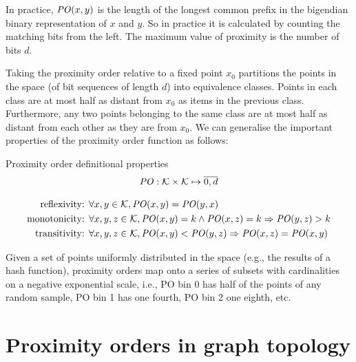 In practice, $\mathit{PO}(x,y)$ is the length of the longest common prefix in the bigendian binary representation of $x$ and $y$. So in practice it is calculated by counting the matching bits from the left. The maximum value of proximity is the number of bits $d$.

Taking the proximity order relative to a fixed point $x_0$ partitions the points in
the space (of bit sequences of length $d$) into equivalence classes. Points in each class are at
most half as distant from $x_0$ as items in the previous class. Furthermore, any two points belonging to the same class are at most half as distant from each other as they are from $x_0$. We can generalise the important properties of the proximity order function as follows:

\begin{definition}{Proximity order definitional properties}\label{def:PO}
\begin{equation}
\mathit{PO}: \mathcal{K}\times \mathcal{K}\mapsto \overline{0,d}
\end{equation}

\begin{subequations}
  \begin{align}
    \label{eq:PO-constraint-symmetry} \text{reflexivity:  }&\forall x,y\in \mathcal{K}, \mathit{PO}(x,y)=\mathit{PO}(y,x)\\
    \label{eq:PO-constraint-monotonicity}\text{monotonicity:   }&\forall x,y,z\in \mathcal{K}, \mathit{PO}(x,y)=k \land  \mathit{PO}(x,z)=k \Rightarrow  \mathit{PO}(y,z)>k\\
\label{eq:PO-constraint-transitivity}\text{transitivity:   }&\forall x,y,z\in \mathcal{K}, \mathit{PO}(x,y)<\mathit{PO}(y,z) \Rightarrow \mathit{PO}(x,z)=\mathit{PO}(x,y)
   \end{align}
\end{subequations}
\end{definition}

Given a set of points uniformly distributed in the space (e.g., the results of a hash function), proximity orders map onto a series of subsets with cardinalities on a negative exponential scale, i.e., PO bin 0 has half of the points of any random sample, PO bin 1 has one fourth, PO bin 2 one eighth, etc.

\section{Proximity orders in graph topology}

